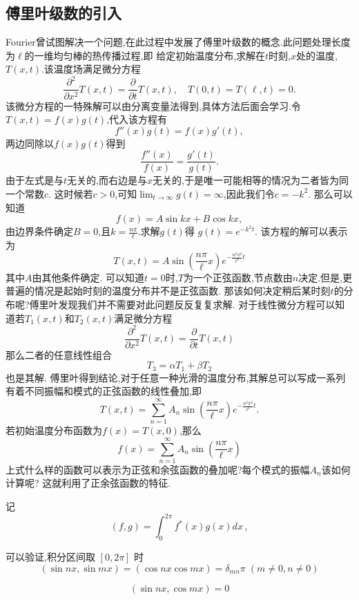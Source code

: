 
\subsection{傅里叶级数的引入}
\label{subsec:fourier_series}
Fourier曾试图解决一个问题,在此过程中发展了傅里叶级数的概念.此问题处理长度为$\ell$的一维均匀棒的热传播过程,即
给定初始温度分布,求解在$t$时刻,$x$处的温度,$T(x,t)$.该温度场满足微分方程
$$
\frac{\partial^2}{\partial x^2} T(x,t) = \frac{\partial}{\partial t} T(x,t), \quad  T(0,t) = T(\ell,t) = 0 .  
$$
该微分方程的一特殊解可以由分离变量法得到,具体方法后面会学习.令$T(x,t) = f(x) g(t)$,代入该方程有
$$
  f''(x) g(t) = f(x) g'(t) ,
$$
两边同除以$f(x)g(t)$得到
$$
\frac{f''(x)}{f(x)} = \frac{g'(t)}{g(t)}   .
$$
由于左式是与$t$无关的,而右边是与$x$无关的,于是唯一可能相等的情况为二者皆为同一个常数$c$.
这时候若$c>0$,可知$\lim_{t\to \infty} g(t) = \infty$,因此我们令$c=-k^2$.
那么可以知道
$$
f(x) =  A \sin{k x} + B \cos{k x},    
$$
由边界条件确定$B = 0$,且$k = \frac{n\pi}{\ell}$.求解$g(t)$得 $g(t) = e^{-k^2 t}$.
该方程的解可以表示为
$$
T(x,t) = A \sin{\left( \frac{n\pi}{\ell} x \right)} e^{-\frac{n^2\pi^2}{\ell^2} t}  
$$
其中$A$由其他条件确定.
可以知道$t=0$时,$T$为一个正弦函数,节点数由$n$决定.但是,更普遍的情况是起始时刻的温度分布并不是正弦函数.
那该如何决定稍后某时刻$t$的分布呢?傅里叶发现我们并不需要对此问题反反复复求解.
对于线性微分方程可以知道若$T_1(x,t)$和$T_2(x,t)$满足微分方程
$$
    \frac{\partial^2}{\partial x^2} T(x,t) = \frac{\partial}{\partial t} T(x,t)
$$
那么二者的任意线性组合
$$
T_3 = \alpha T_1  + \beta T_2  
$$
也是其解.
傅里叶得到结论,对于任意一种光滑的温度分布,其解总可以写成一系列有着不同振幅和模式的正弦函数的线性叠加,即
$$
  T(x,t) = \sum_{n=1}^{\infty} A_n \sin {\left( \frac{n\pi}{\ell} x \right)} e^{-\frac{n^2\pi^2}{\ell^2} t} .     
$$
若初始温度分布函数为$f(x) = T(x,0)$,那么
$$
  f(x) =      \sum_{n=1}^{\infty} A_n \sin {\left( \frac{n\pi}{\ell} x \right)}
$$
上式什么样的函数可以表示为正弦和余弦函数的叠加呢?每个模式的振幅$A_n$该如何计算呢?
这就利用了正余弦函数的特征.

记
\begin{equation}
 (f, g) = \int_0^{2\pi} f^{*}(x) g(x) dx\,,
\end{equation}

可以验证,积分区间取 $[0,2\pi]$ 时
$$
(\sin{ n x }, \sin{m x })  =  (\cos{ n x } \cos {m x })  =  \delta_{mn}\pi  \; (m\neq 0, n\neq 0)
$$

$$
(\sin{ n x },  \cos{m x })  =  0
$$

